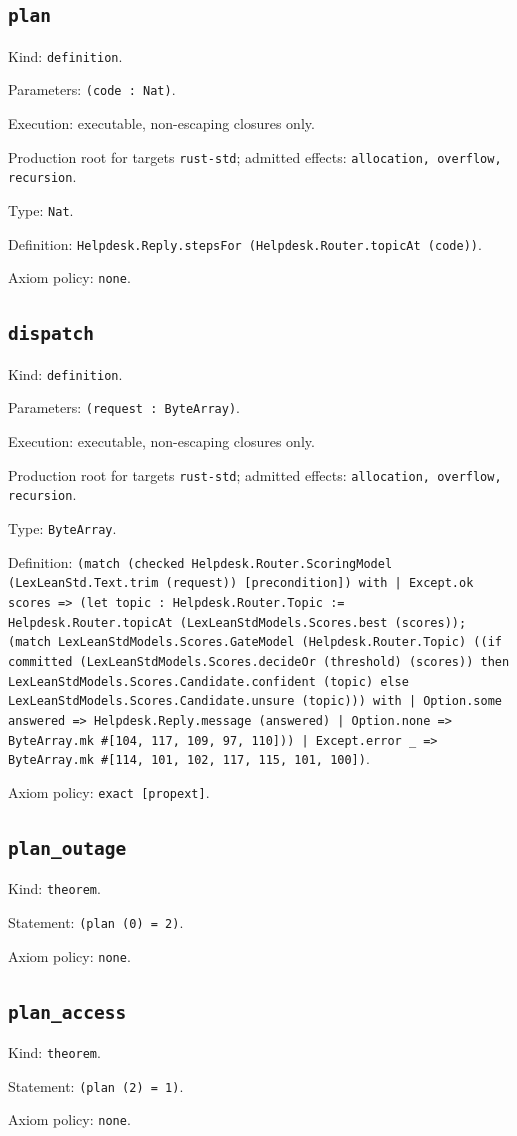 \documentclass[11pt]{article}
\begin{document}
\subsection*{\texttt{plan}}
\noindent Kind: \texttt{definition}.\par
\noindent Parameters: \texttt{(code : Nat)}.\par
\noindent Execution: executable, non-escaping closures only.\par
\noindent Production root for targets \texttt{rust-std}; admitted effects: \texttt{allocation, overflow, recursion}.\par
\noindent Type: \texttt{Nat}.\par
\noindent Definition: \texttt{Helpdesk.Reply.stepsFor (Helpdesk.Router.topicAt (code))}.\par
\noindent Axiom policy: \texttt{none}.\par
\subsection*{\texttt{dispatch}}
\noindent Kind: \texttt{definition}.\par
\noindent Parameters: \texttt{(request : ByteArray)}.\par
\noindent Execution: executable, non-escaping closures only.\par
\noindent Production root for targets \texttt{rust-std}; admitted effects: \texttt{allocation, overflow, recursion}.\par
\noindent Type: \texttt{ByteArray}.\par
\noindent Definition: \texttt{(match (checked Helpdesk.Router.ScoringModel (LexLeanStd.Text.trim (request)) [precondition]) with | Except.ok scores => (let topic : Helpdesk.Router.Topic := Helpdesk.Router.topicAt (LexLeanStdModels.Scores.best (scores)); (match LexLeanStdModels.Scores.GateModel (Helpdesk.Router.Topic) ((if committed (LexLeanStdModels.Scores.decideOr (threshold) (scores)) then LexLeanStdModels.Scores.Candidate.confident (topic) else LexLeanStdModels.Scores.Candidate.unsure (topic))) with | Option.some answered => Helpdesk.Reply.message (answered) | Option.none => ByteArray.mk \#[104, 117, 109, 97, 110])) | Except.error \_ => ByteArray.mk \#[114, 101, 102, 117, 115, 101, 100])}.\par
\noindent Axiom policy: \texttt{exact [propext]}.\par
\subsection*{\texttt{plan\_outage}}
\noindent Kind: \texttt{theorem}.\par
\noindent Statement: \texttt{(plan (0) = 2)}.\par
\noindent Axiom policy: \texttt{none}.\par
\subsection*{\texttt{plan\_access}}
\noindent Kind: \texttt{theorem}.\par
\noindent Statement: \texttt{(plan (2) = 1)}.\par
\noindent Axiom policy: \texttt{none}.\par
\end{document}
